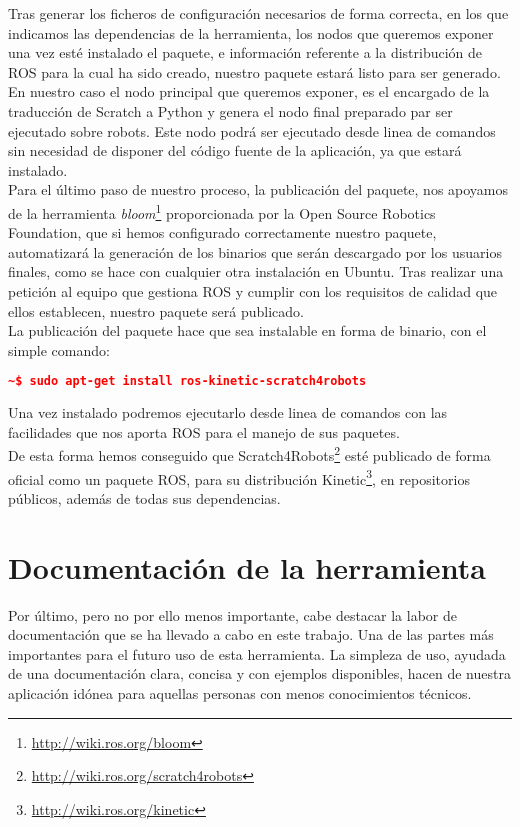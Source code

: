 Tras generar los ficheros de configuración necesarios de forma correcta, en los que indicamos las dependencias de la herramienta, los nodos que queremos exponer una vez esté instalado el paquete, e información referente a la distribución de ROS para la cual ha sido creado, nuestro paquete estará listo para ser generado.\\

En nuestro caso el nodo principal que queremos exponer, es el encargado de la traducción de Scratch a Python y genera el nodo final preparado par ser ejecutado sobre robots. Este nodo podrá ser ejecutado desde linea de comandos sin necesidad de disponer del código fuente de la aplicación, ya que estará instalado.\\

Para el último paso de nuestro proceso, la publicación del paquete, nos apoyamos de la herramienta \textit{bloom}\footnote{\url{http://wiki.ros.org/bloom}} proporcionada por la Open Source Robotics Foundation, que si hemos configurado correctamente nuestro paquete, automatizará la generación de los binarios que serán descargado por los usuarios finales, como se hace con cualquier otra instalación en Ubuntu. Tras realizar una petición al equipo que gestiona ROS y cumplir con los requisitos de calidad que ellos establecen, nuestro paquete será publicado.\\ 

La publicación del paquete hace que sea instalable en forma de binario, con el simple comando:\\ 

\begin{lstlisting}[language=json,firstnumber=1]
~$ sudo apt-get install ros-kinetic-scratch4robots
\end{lstlisting}

Una vez instalado podremos ejecutarlo desde linea de comandos con las facilidades que nos aporta ROS para el manejo de sus paquetes.\\

De esta forma hemos conseguido que Scratch4Robots\footnote{\url{http://wiki.ros.org/scratch4robots}} esté publicado de forma oficial como un paquete ROS, para su distribución Kinetic\footnote{\url{http://wiki.ros.org/kinetic}}, en repositorios públicos, además de todas sus dependencias. 


\section{Documentación de la herramienta}
\label{sec:documentación}
Por último, pero no por ello menos importante, cabe destacar la labor de documentación que se ha llevado a cabo en este trabajo. Una de las partes más importantes para el futuro uso de esta herramienta. La simpleza de uso, ayudada de una documentación clara, concisa y con ejemplos disponibles, hacen de nuestra aplicación idónea para aquellas personas con menos conocimientos técnicos.\\

